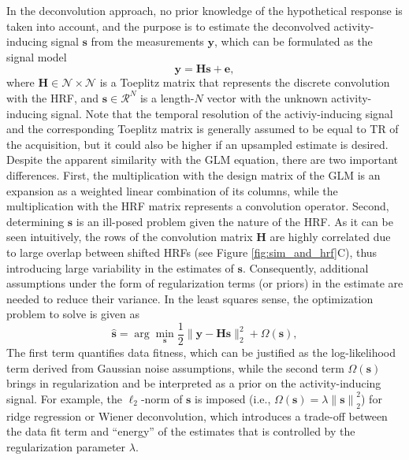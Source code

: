 In the deconvolution approach, no prior knowledge of the hypothetical response is taken into account, and the purpose is to estimate the deconvolved activity-inducing signal $\mathbf{s}$ from the measurements $\mathbf{y}$, which can be formulated as the signal model
\begin{equation}
    \label{eq:synthesis_model}
    \mathbf{y} = \mathbf{Hs} + \mathbf{e},
\end{equation}
where $\mathbf{H} \in \mathcal{N \times N}$ is a Toeplitz matrix that represents the discrete convolution with the HRF, and $\mathbf{s} \in \mathcal{R}^{N}$ is a length-$N$ vector with the unknown activity-inducing signal. Note that the temporal resolution of the activiy-inducing signal and the corresponding Toeplitz matrix is generally assumed to be equal to TR of the acquisition, but it could also be higher if an upsampled estimate is desired. Despite the apparent similarity with the GLM equation, there are two important differences. First, the multiplication with the design matrix of the GLM is an expansion as a weighted linear combination of its columns, while the multiplication with the HRF matrix represents a convolution operator. Second, determining $\mathbf{s}$ is an ill-posed problem given the nature of the HRF. As it can be seen intuitively, the rows of the convolution matrix $\mathbf{H}$ are highly correlated due to large overlap between shifted HRFs (see Figure \ref{fig:sim_and_hrf}C), thus introducing large variability in the estimates of $\mathbf{s}$. Consequently, additional assumptions under the form of regularization terms (or priors) in the estimate are needed to reduce their variance. In the least squares sense, the optimization problem to solve is given as 
\begin{equation}
    \label{eq:regularized_least_squares}
    \hat{\mathbf{s}} = \arg \min_{\mathbf{s}} \frac{1}{2} \| \mathbf{y} - \mathbf{Hs} \|_2^2 + \Omega(\mathbf{s}),
\end{equation}
The first term quantifies data fitness, which can be justified as the log-likelihood term derived from Gaussian noise assumptions, while the second term \(\Omega(\mathbf{s})\) brings in regularization and be interpreted as a prior on the activity-inducing signal. For example, the $\ell_2$-norm of $\mathbf{s}$ is imposed (i.e., $\Omega(\mathbf{s})=\lambda \left\| \mathbf{s}\right\|_2^2$) for ridge regression or Wiener deconvolution, which introduces a trade-off between the data fit term and ``energy'' of the estimates that is controlled by the regularization parameter $\lambda$. %

